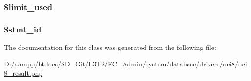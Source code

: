 \subsubsection[{\$limit\+\_\+used}]{\setlength{\rightskip}{0pt plus 5cm}\$limit\+\_\+used}\label{class_c_i___d_b__oci8__result_a96df35d7e3e76bef21ebb80234fe59e8}
\hypertarget{class_c_i___d_b__oci8__result_a1a97f17fd259cd27c73b65e6c3706ec0}{}
\subsubsection[{\$stmt\+\_\+id}]{\setlength{\rightskip}{0pt plus 5cm}\$stmt\+\_\+id}\label{class_c_i___d_b__oci8__result_a1a97f17fd259cd27c73b65e6c3706ec0}


The documentation for this class was generated from the following file\+:\begin{DoxyCompactItemize}
\item 
D\+:/xampp/htdocs/\+S\+D\+\_\+\+Git/\+L3\+T2/\+F\+C\+\_\+\+Admin/system/database/drivers/oci8/\hyperlink{oci8__result_8php}{oci8\+\_\+result.\+php}\end{DoxyCompactItemize}
